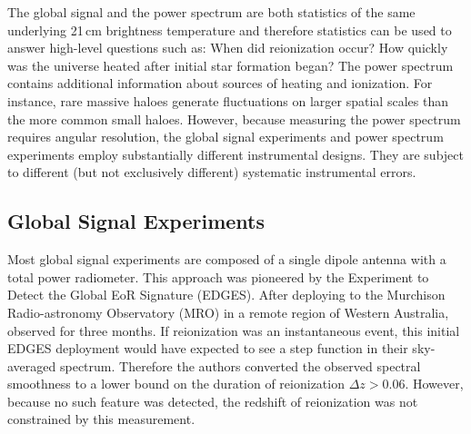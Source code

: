 \begin{bibunit}
The global signal and the power spectrum are both statistics of the same underlying 21\,cm
brightness temperature and therefore statistics can be used to answer high-level questions such as:
When did reionization occur? How quickly was the universe heated after initial star formation began?
The power spectrum contains additional information about sources of heating and ionization. For
instance, rare massive haloes generate fluctuations on larger spatial scales than the more common
small haloes.  However, because measuring the power spectrum requires angular resolution, the global
signal experiments and power spectrum experiments employ substantially different instrumental
designs. They are subject to different (but not exclusively different) systematic instrumental
errors.


\subsection{Global Signal Experiments}

Most global signal experiments are composed of a single dipole antenna with a total power
radiometer. This approach was pioneered by the Experiment to Detect the Global EoR Signature
(EDGES). After deploying to the Murchison Radio-astronomy Observatory (MRO) in a remote region of
Western Australia, \citet{2010Natur.468..796B} observed for three months. If reionization was an
instantaneous event, this initial EDGES deployment would have expected to see a step function in
their sky-averaged spectrum. Therefore the authors converted the observed spectral smoothness to a
lower bound on the duration of reionization $\Delta z > 0.06$. However, because no such feature was
detected, the redshift of reionization was not constrained by this measurement.


\end{bibunit}
